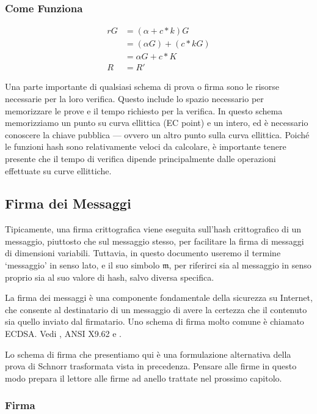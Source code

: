 \subsubsection*{Come Funziona}

\begin{align*}
r G &= (\alpha + c*k) G \\
	&= (\alpha G) + (c*k G) \\
	&= \alpha G + c*K \\
  R &= R'
\end{align*}

Una parte importante di qualsiasi schema di prova o firma sono le risorse necessarie per la loro verifica. Questo include lo spazio necessario per memorizzare le prove e il tempo richiesto per la verifica. In questo schema memorizziamo un punto su curva ellittica (EC point) e un intero, ed è necessario conoscere la chiave pubblica — ovvero un altro punto sulla curva ellittica. Poiché le funzioni hash sono relativamente veloci da calcolare, è importante tenere presente che il tempo di verifica dipende principalmente dalle operazioni effettuate su curve ellittiche.


\subsection{Firma dei Messaggi}
\label{sec:signing-messages}

Tipicamente, una firma crittografica viene eseguita sull'hash crittografico di un messaggio, piuttosto che sul messaggio stesso, per facilitare la firma di messaggi di dimensioni variabili. Tuttavia, in questo documento useremo il termine `messaggio' in senso lato, e il suo simbolo $\mathfrak{m}$, per riferirci sia al messaggio in senso proprio sia al suo valore di hash, salvo diversa specifica.

La firma dei messaggi è una componente fondamentale della sicurezza su Internet, che consente al destinatario di un messaggio di avere la certezza che il contenuto sia quello inviato dal firmatario. Uno schema di firma molto comune è chiamato ECDSA. Vedi \cite{ecdsa}, ANSI X9.62 e \cite{Hankerson:2003:GEC:940321}.

Lo schema di firma che presentiamo qui è una formulazione alternativa della prova di Schnorr trasformata vista in precedenza. Pensare alle firme in questo modo prepara il lettore alle firme ad anello trattate nel prossimo capitolo.

\subsubsection*{Firma}

